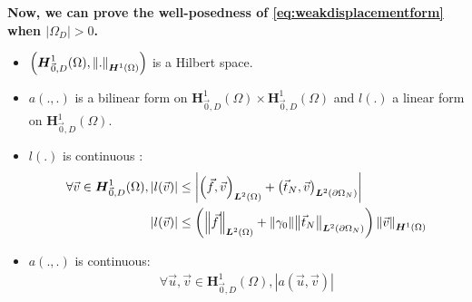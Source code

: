 \documentclass[a4paper,12pt,twoside]{report}
\begin{document}
\noindent \textbf{Now, we can prove the well-posedness of \eqref{eq:weakdisplacementform} when $\left| \Omega_D \right| > 0$.}
\begin{itemize}
    \item $\left(\boldsymbol H^1_{\vec 0,D}(\Omega), \norm{.}_{\boldsymbol H^1(\Omega)} \right)$ is a Hilbert space.
    \item $a(.,.)$ is a bilinear form on $\boldsymbol H^1_{\vec 0,D}(\Omega) \times \boldsymbol H^1_{\vec 0,D}(\Omega)$ and $l(.)$ a linear form on $\boldsymbol H^1_{\vec 0,D}(\Omega)$.
    \item $l(.)$ is continuous : \begin{equation*}
    \begin{aligned}    
    \forall \vec v \in \boldsymbol H^1_{\vec 0,D}(\Omega), \left|l(\vec v)\right| 
    & \leq \left| \left(\vec f, \vec v \right)_{\boldsymbol L^2(\Omega)} + \left(\vec t_N, \vec v \right)_{\boldsymbol L^2(\partial \Omega_N)} \right| \\
    \left|l(\vec v)\right| 
    & \leq \left( \norm{\vec f}_{\boldsymbol L^2(\Omega)} + \norm{\gamma_0} \norm{\vec t_N}_{\boldsymbol L^2(\partial \Omega_N)}\right)\norm{\vec v}_{\boldsymbol H^1(\Omega)}\\
    \end{aligned}
    \end{equation*}
    \item $a(.,.)$ is continuous: 
    \begin{equation*}
        \begin{aligned}
        \forall \vec u, \vec v \in \boldsymbol H^1_{\vec 0,D}(\Omega), \left| a(\vec u, \vec v) \right| 

\end{aligned}
\end{equation*}
\end{itemize}
\end{document}
